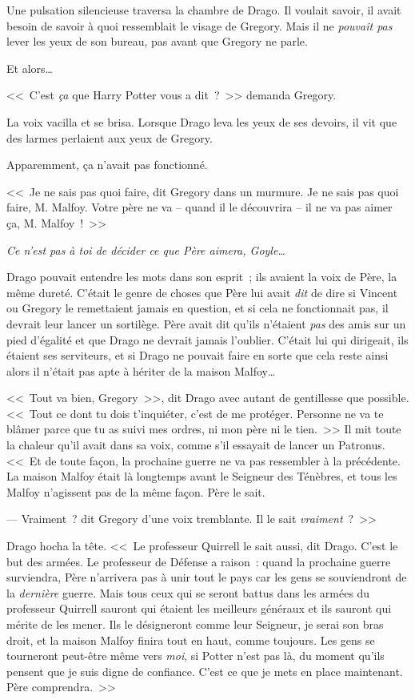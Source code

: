 Une pulsation silencieuse traversa la chambre de Drago. Il voulait savoir, il avait besoin de savoir à quoi ressemblait le visage de Gregory. Mais il ne \emph{pouvait pas} lever les yeux de son bureau, pas avant que Gregory ne parle.

Et alors…

<<~C'est \emph{ça} que Harry Potter vous a dit~?~>> demanda Gregory.

La voix vacilla et se brisa. Lorsque Drago leva les yeux de ses devoirs, il vit que des larmes perlaient aux yeux de Gregory.

Apparemment, ça n'avait pas fonctionné.

<<~Je ne sais pas quoi faire, dit Gregory dans un murmure. Je ne sais pas quoi faire, M. Malfoy. Votre père ne va -- quand il le découvrira -- il ne va pas aimer ça, M. Malfoy~!~>>

\emph{Ce n'est pas à toi de décider ce que Père aimera, Goyle…}

Drago pouvait entendre les mots dans son esprit~; ils avaient la voix de Père, la même dureté. C'était le genre de choses que Père lui avait \emph{dit} de dire si Vincent ou Gregory le remettaient jamais en question, et si cela ne fonctionnait pas, il devrait leur lancer un sortilège. Père avait dit qu'ils n'étaient \emph{pas} des amis sur un pied d'égalité et que Drago ne devrait jamais l'oublier. C'était lui qui dirigeait, ils étaient ses serviteurs, et si Drago ne pouvait faire en sorte que cela reste ainsi alors il n'était pas apte à hériter de la maison Malfoy…

<<~Tout va bien, Gregory~>>, dit Drago avec autant de gentillesse que possible. <<~Tout ce dont tu dois t'inquiéter, c'est de me protéger. Personne ne va te blâmer parce que tu as suivi mes ordres, ni mon père ni le tien.~>> Il mit toute la chaleur qu'il avait dans sa voix, comme s'il essayait de lancer un Patronus. <<~Et de toute façon, la prochaine guerre ne va pas ressembler à la précédente. La maison Malfoy était là longtemps avant le Seigneur des Ténèbres, et tous les Malfoy n'agissent pas de la même façon. Père le sait.

--- Vraiment~? dit Gregory d'une voix tremblante. Il le sait \emph{vraiment}~?~>>

Drago hocha la tête. <<~Le professeur Quirrell le sait aussi, dit Drago. C'est le but des armées. Le professeur de Défense a raison~: quand la prochaine guerre surviendra, Père n'arrivera pas à unir tout le pays car les gens se souviendront de la \emph{dernière} guerre. Mais tous ceux qui se seront battus dans les armées du professeur Quirrell sauront qui étaient les meilleurs généraux et ils sauront qui mérite de les mener. Ils le désigneront comme leur Seigneur, je serai son bras droit, et la maison Malfoy finira tout en haut, comme toujours. Les gens se tourneront peut-être même vers \emph{moi}, si Potter n'est pas là, du moment qu'ils pensent que je suis digne de confiance. C'est ce que je mets en place maintenant. Père comprendra.~>>

